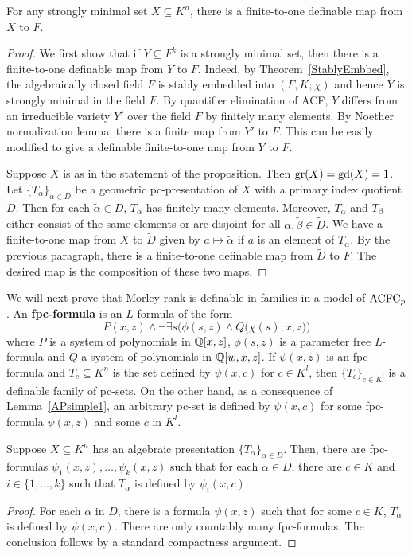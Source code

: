 \begin{prop}
For any strongly minimal set $X \subseteq K^n$, there is a finite-to-one definable map from $X$ to $F$.
\end{prop}
\begin{proof}

We first show that if $Y \subseteq F^k$ is a strongly minimal set, then there is a finite-to-one definable map from $Y$ to $F$.
Indeed, by Theorem~\ref{StablyEmbbed}, the algebraically closed field $F$ is stably embedded into $(F, K; \chi)$ and hence $Y$ is strongly minimal in the field $F$.
By quantifier elimination of ACF, $Y$ differs from an irreducible variety $Y'$ over the field $F$ by finitely many elements.
By Noether normalization lemma, there is a finite map from $Y'$ to $F$. This can be easily modified to give a definable finite-to-one map from $Y$ to $F$.

Suppose $X$ is as in the statement of the proposition.
Then $\mathrm{gr}(X)=\mathrm{gd}(X)=1$.
Let $\{ T_\alpha\}_{\alpha \in D}$ be a geometric pc-presentation of $X$ with a primary index quotient $\widetilde{D}$.
Then for each $\tilde{\alpha} \in \widetilde{D}$, $T_\alpha$ has finitely many elements. Moreover, $T_\alpha$ and $T_\beta$  either consist of the same elements or are disjoint for all $\tilde{\alpha},\tilde{\beta} \in \widetilde{D}$.
We have a finite-to-one map from $X$ to $\widetilde{D}$ given by $a \mapsto \tilde{\alpha}$ if $a$ is an element of $T_\alpha$. By the previous paragraph, there is a finite-to-one definable map from $\widetilde{D}$ to $F$. The desired map is the composition of these two maps. 
\end{proof}


\noindent
We will next prove that Morley rank is definable in families in a model of $\mathrm{ACFC}_p$.
An {\bf fpc-formula} is an $L$-formula of the form 
$$P(x, z) \wedge \neg \exists s \Big( \phi(s, z) \wedge Q\big(\chi(s),x, z\big)\Big)$$
where $P$ is a system of polynomials in $\mathbb{Q}[x, z]$, $\phi(s, z)$ is a parameter free $L$-formula and $Q$ a system of polynomials in $\mathbb{Q}[w,x,z]$. If  $\psi(x,z)$  is an fpc-formula and $T_c \subseteq K^n$ is the set defined by $\psi(x, c)$ for $c \in K^l$, then $\{ T_c\}_{c \in K^l}$ is a definable family of pc-sets. On the other hand, as a consequence of Lemma~\ref{APsimple1}, an arbitrary pc-set is defined by $\psi(x,c)$ for some fpc-formula $\psi(x,z)$ and some $c$ in $K^{l}$.

\begin{lem}  \label{APsimple3}
Suppose \( X \subseteq K^n\) has an algebraic presentation $\{T_\alpha\}_{ \alpha \in D}$. Then, there are fpc-formulas $\psi_1(x,z), \ldots, \psi_k(x,z)$ such that for each $\alpha \in D$, there are $c \in K$ and $i \in \{1, \ldots, k\}$ such that $T_\alpha$ is defined by $\psi_i( x,c)$.
\end{lem}
\begin{proof}
For each $\alpha$ in $D$, there is a formula $\psi(x,z)$ such that for some $c \in K$, $T_\alpha$ is defined by $\psi(x,c)$. There are only countably many fpc-formulas. The conclusion follows by a standard compactness argument.
\end{proof}

